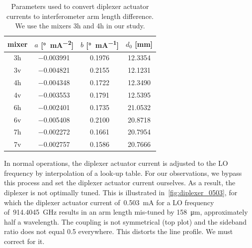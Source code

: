 \begin{table}
    \centering
    \begin{tabular}{cccc}
        \toprule
        mixer &
        $a$ [\si{\degree\per\milli\ampere\squared}]
        &
        $b$ [\si{\degree\per\milli\ampere}]
        &
        $d_0$ [\si{\milli\meter}]
        \\
        \midrule
        3h    &  \num{-0.003991} & 0.1976 & 12.3354\\
        3v    &  \num{-0.004821} & 0.2155 & 12.1231\\
        4h    &  \num{-0.004348} & 0.1722 & 12.3490\\
        4v    &  \num{-0.003553} & 0.1791 & 12.5395\\
        6h    &  \num{-0.002401} & 0.1735 & 21.0532\\
        6v    &  \num{-0.005408} & 0.2100 & 20.8718\\
        7h    &  \num{-0.002272} & 0.1661 & 20.7954\\
        7v    &  \num{-0.002757} & 0.1586 & 20.7666\\
        \bottomrule
    \end{tabular}
    \caption{Parameters used to convert diplexer actuator currents to interferometer arm length difference.
    We use the mixers 3h and 4h in our study.}
    \label{tab:diplexer_params}
\end{table}

In normal operations, the diplexer actuator current is adjusted to the LO frequency by interpolation of a look-up table.
For our observations, we bypass this process and set the diplexer actuator current ourselves.
As a result, the diplexer is not optimally tuned.
This is illustrated in~\cref{fig:diplexer_0503}, for which the diplexer actuator current of~\SI{0.503}{\milli\ampere} for a LO frequency of~\SI{914.4045}{\giga\hertz} results in an arm length mis-tuned by \SI{158}{\micro\meter}, approximately half a wavelength.
The coupling is not symmetrical (top plot) and the sideband ratio does not equal \num{0.5} everywhere.
This distorts the line profile.
We must correct for it.


